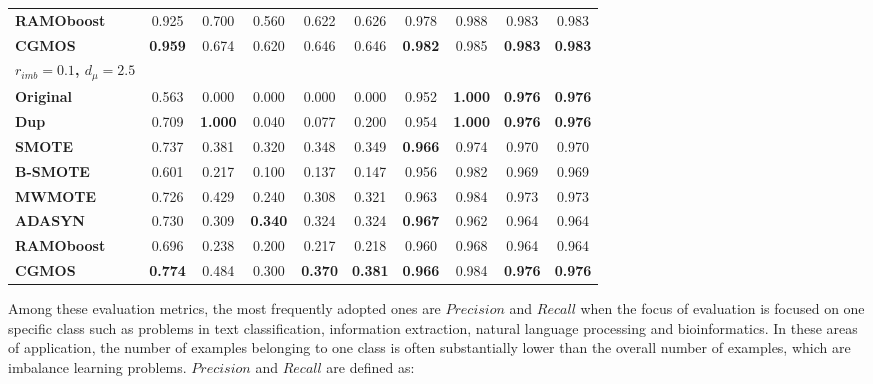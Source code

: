 \documentclass{iitthesis}
\begin{document}
\begin{table}[]
\begin{center}
{\begin{tabular}{lccccccccc}
\multicolumn{1}{l}{\textbf{RAMOboost}} & 0.925 & 0.700 & 0.560 & 0.622 & 0.626 & 0.978 & 0.988 & 0.983 & 0.983 \\
\multicolumn{1}{l}{\textbf{CGMOS}} & \textbf{0.959} & 0.674 & 0.620 & 0.646 & 0.646 & \textbf{0.982} & 0.985 & \textbf{0.983} & \textbf{0.983} \\
\hline
\multicolumn{1}{l}{\textbf{$r_{imb}=0.1$, $d_{\mu}=2.5$}} &  & \multicolumn{4}{c}{} & \multicolumn{4}{c}{} \\
\hline
\multicolumn{1}{l}{\textbf{Original}} & 0.563 & 0.000 & 0.000 & 0.000 & 0.000 & 0.952 & \textbf{1.000} & \textbf{0.976} & \textbf{0.976} \\
\multicolumn{1}{l}{\textbf{Dup}} & 0.709 & \textbf{1.000} & 0.040 & 0.077 & 0.200 & 0.954 & \textbf{1.000} & \textbf{0.976} & \textbf{0.976} \\ 
\multicolumn{1}{l}{\textbf{SMOTE}} & 0.737 & 0.381 & 0.320 & 0.348 & 0.349 & \textbf{0.966} & 0.974 & 0.970 & 0.970 \\
\multicolumn{1}{l}{\textbf{B-SMOTE}} & 0.601 & 0.217 & 0.100 & 0.137 & 0.147 & 0.956 & 0.982 & 0.969 & 0.969 \\
\multicolumn{1}{l}{\textbf{MWMOTE}} & 0.726 & 0.429 & 0.240 & 0.308 & 0.321 & 0.963 & 0.984 & 0.973 & 0.973 \\
\multicolumn{1}{l}{\textbf{ADASYN}} & 0.730 & 0.309 & \textbf{0.340} & 0.324 & 0.324 & \textbf{0.967} & 0.962 & 0.964 & 0.964 \\
\multicolumn{1}{l}{\textbf{RAMOboost}} & 0.696 & 0.238 & 0.200 & 0.217 & 0.218 & 0.960 & 0.968 & 0.964 & 0.964 \\
\multicolumn{1}{l}{\textbf{CGMOS}} & \textbf{0.774} & 0.484 & 0.300 & \textbf{0.370} & \textbf{0.381} & \textbf{0.966} & 0.984 & \textbf{0.976} & \textbf{0.976} \\
\hline
\end{tabular}
}
\end{center}
\label{tab: results_synthetic_data}
\end{table}


Among these evaluation metrics, the most frequently adopted ones are $Precision$ and $Recall$ when the focus of evaluation is focused on one specific class such as problems in text classification, information extraction, natural language processing and bioinformatics. In these areas of application, the number of examples belonging to one class is often substantially lower than the overall number of examples, which are imbalance learning problems. $Precision$ and $Recall$ are defined as:
\end{document}
